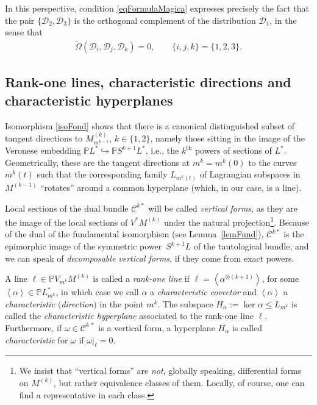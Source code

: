\documentclass[pdftex]{sigma}
\newcommand{\C}{\mathcal{C}}
\newcommand{\D}{\mathcal{D}}
\newcommand{\Span}[1]{\left\langle #1 \right\rangle}
\renewcommand{\P}{\mathbb{P}}
\newcommand{\Th}{^\textrm{th}}
\numberwithin{equation}{section}
\begin{document}
\begin{Remark}\label{remFomulaMagicaIntrinseca}
In this perspective, condition \eqref{eqFormulaMagica} expresses precisely the fact that the pair $\{\D_2,\D_3\}$ is the orthogonal complement of the distribution $\D_1$, in the sense that
\begin{gather*}
\widetilde{\Omega}(\D_i,\D_j,\D_k)=0,\qquad \{i,j,k\}=\{1,2,3\}.
\end{gather*}
\end{Remark}

\subsection{Rank-one lines, characteristic directions and characteristic hyperplanes}\label{subsubRankUnoChar}

Isomorphism \eqref{isoFond} shows that there is a canonical distinguished subset of tangent directions to $M^{(k)}_{m^{k-1}}$, $k\in\{1,2\}$, namely those sitting in the image of the Veronese embedding $\P L^\ast\hookrightarrow \P S^{k+1}L^\ast$, i.e., the $k\Th$ powers of sections of $L^\ast $. Geometrically, these are the tangent directions at $m^k=m^k(0)$ to the curves $m^k(t)$ such that the corresponding family $L_{m^k(t)}$ of Lagrangian subspaces in $M^{(k-1)}$ ``rotates'' around a common hyperplane (which, in our case, is a line).

Local sections of the dual bundle $\C^{k\ast}$ will be called \emph{vertical forms}, as they are the image of the local sections of $V^*M^{(k)}$ under the natural projection\footnote{We insist that ``vertical forms'' are \emph{not}, globally speaking, dif\/ferential forms on $M^{(k)}$, but rather equivalence classes of them. Locally, of course, one can f\/ind a representative in each class.}. Because of the dual of the fundamental isomorphism (see Lemma~\ref{lemFund}), $\C^{k\ast}$ is the epimorphic image of the symmetric power~$S^{k+1}L$ of the tautological bundle, and we can speak of \emph{decomposable vertical forms}, if they come from exact powers.

\begin{Definition}\label{defRankOneLine}
 A line $\ell\in \mathbb{P}V_{m^k}M^{(k)}$ is called a \emph{rank-one line} if $\ell=\Span{\alpha^{\otimes (k+1)}}$, for some $\Span{\alpha}\in \P L_{m^k}^\ast$, in which case we call $\alpha$ a \emph{characteristic covector} and $\Span{\alpha}$ a \emph{characteristic $($direction$)$} in the point $m^k$. The subspace $H_\alpha:=\ker\alpha\leq L_{m^k}$ is called the \emph{characteristic hyperplane} associated to the rank-one line $\ell$. Furthermore, if $\omega\in\C^{k\,\ast}$ is a vertical form, a hyperplane $H_\alpha$ is called \emph{characteristic} for $\omega$ if $\omega|_\ell=0$.
\end{Definition}
\end{document}
